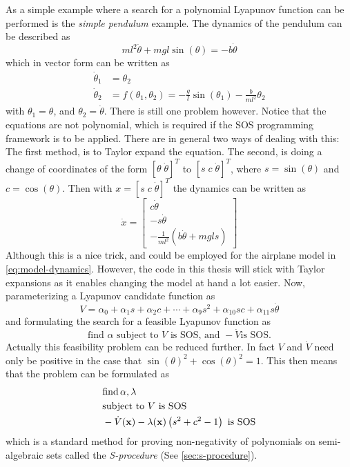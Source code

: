 As a simple example where a search for a polynomial Lyapunov function can be
performed is the \textit{simple pendulum} example. The dynamics of the pendulum
can be described as
\[
  ml^2\ddot{\theta} + mgl \sin{(\theta)} = -b\dot{\theta}
\]
which in vector form can be written as
\begin{align*}
  \dot{\theta}_1 &= \theta_2 \\
  \dot{\theta}_2 &= f(\theta_1,\theta_2) = -\frac{g}{l}\sin{(\theta_1)} -\frac{b}{ml^2}\theta_2
\end{align*}
with \(\theta_1 = \theta\), and \(\theta_2 = \dot{\theta}\). There is still one
problem however. Notice that the equations are not polynomial, which is required
if the \ac{SOS} programming framework is to be applied. There are in general two
ways of dealing with this: The first method, is to Taylor expand the equation.
The second, is doing a change of coordinates of the form \(\left[ \theta \;
  \dot{\theta} \right]^{T} \) to \(\left[ s \;c \; \dot{\theta} \right]^{T}\),
where \(s = \sin{(\theta)}\) and \(c = \cos{(\theta)}\). Then with \(x = {\left[
    s \; c \; \dot{\theta} \right]}^{T}\) the dynamics can be written as
\[
  \dot{x} =
  \begin{bmatrix}
    c\dot{\theta} \\
    -s\dot{\theta} \\
    - \frac{1}{ml^2} \left( b\dot{\theta} + mgl s \right)
  \end{bmatrix}
\]
Although this is a nice trick, and could be employed for the airplane model in
\cref{eq:model-dynamics}. However, the code in this thesis will stick with
Taylor expansions as it enables changing the model at hand a lot easier. Now,
parameterizing a Lyapunov candidate function as
\[
  V = \alpha_0 + \alpha_1s + \alpha_2c + \cdots + \alpha_9s^2 + \alpha_{10}sc +
  \alpha_{11}s\dot{\theta}
\]
and formulating the search for a feasible Lyapunov function as
\[
  \text{find } \alpha \text{ subject to } V \text{ is SOS, and } -\dot{V} \text{
    is SOS.}
\]
Actually this feasibility problem can be reduced further. In fact \(V\) and
\(\dot{V}\) need only be positive in the case that \(\sin{(\theta)}^2 +
\cos{(\theta)}^2 = 1\). This then means that the problem can be formulated as
\begin{align*}
  &\text{find}\,\alpha, \lambda \\
  &\text{subject to } V \text{ is SOS} \\
  &-\dot{V}(\mathbf{x}) - \lambda(\mathbf{x})\left( s^2 + c^2 -1 \right) \text{ is SOS}
\end{align*}
which is a standard method for proving non-negativity of polynomials on
semi-algebraic sets called the \textit{S-procedure} (See
\cref{sec:s-procedure}).

